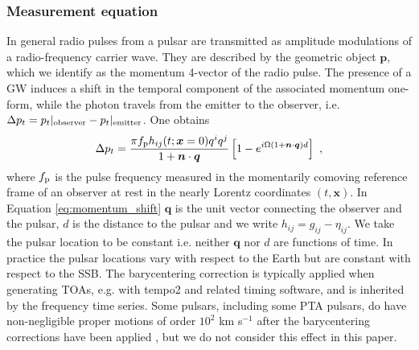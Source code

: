 \documentclass[fleqn,usenatbib,useAMS]{mnras}
\begin{document}
\subsubsection{Measurement equation}
In general radio pulses from a pulsar are transmitted as amplitude modulations of a radio-frequency carrier wave. They are described by the geometric object $\boldsymbol{p}$, which we identify as the momentum 4-vector of the radio pulse. The presence of a GW induces a shift in the temporal component of the associated momentum one-form, while the photon travels from the emitter to the observer, i.e. $\Delta p_t = p_t|_{\rm observer} - p_t|_{\rm emitter} $. One obtains \citep[e.g.][]{Maggiore}
\begin{equation}
 \Delta p_t =  \frac{\pi f_{\rm p} h_{ij} (t; \boldsymbol{x}= 0)q^i q^j }{1 + \boldsymbol{n}\cdot \boldsymbol{q} }  \left[1 -e^{i \Omega (1 + \boldsymbol{n}\cdot \boldsymbol{q})  d}\right] \ ,
	\label{eq:momentum_shift}
\end{equation}
where $f_{\rm p}$ is the pulse frequency measured in the momentarily comoving reference frame of an observer at rest in the nearly Lorentz coordinates $(t,{\boldsymbol{x}})$. In Equation \eqref{eq:momentum_shift} $\boldsymbol{q}$ is the unit vector connecting the observer and the pulsar, $d$ is the distance to the pulsar and we write $h_{ij} = g_{ij} - \eta_{ij}$. We take the pulsar location to be constant i.e.  neither $\boldsymbol{q}$ nor $d$ are functions of time. In practice the pulsar locations vary with respect to the Earth but are constant with respect to the SSB. The barycentering correction is typically applied when generating TOAs, e.g. with {\sc tempo2} \citep{tempo2} and related timing software, and is inherited by the frequency time series. Some pulsars, including some PTA pulsars, do have non-negligible proper motions of order $10^2$ km s$^{-1}$ after the barycentering corrections have been applied \citep[e.g.][]{10.1093/mnras/sty3390}, but we do not consider this effect in this paper.\newline 
\end{document}
